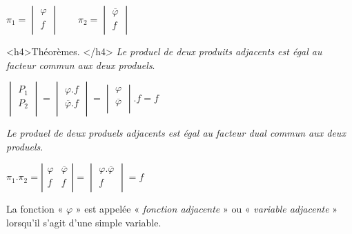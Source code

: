 \centerline{ ${\pi}_1  = \begin{vmatrix} \varphi \\  f \\ \end{vmatrix} \qquad 
                                        {\pi}_2 = \begin{vmatrix} \overline{\varphi}  \\  f \\ \end{vmatrix}  $ }
                    
<h4>Théorèmes. </h4> \emph{ Le produel de deux produits adjacents est égal au facteur commun aux deux produels}. 



\centerline{ $ \begin{vmatrix}
P_1\\P_2\\
\end{vmatrix} 
 = \begin{vmatrix}
        \varphi . f \\ \overline{\varphi} . f \\
    \end{vmatrix} 
       = \begin{vmatrix}
            \varphi \\ \overline{\varphi} \\ 
        \end{vmatrix} .f = f 
  $ }



 \emph{ Le produel de deux produels adjacents est égal au facteur dual commun  aux deux produels}. 
 

 
 \centerline{$
 {\pi}_1 . {\pi}_2 = \left| \begin{array}{c|c} 
                                    \varphi & \overline{\varphi}  \\
                                    f & f \\
                       \end{array}  \right|
       = \begin{vmatrix}
               \varphi . \overline{\varphi} \\ f   \\
       \end{vmatrix} = f 
 $}
 


La fonction « $\varphi$ » est appelée « \emph {fonction adjacente} » ou « \emph {variable adjacente}  » lorsqu'il s'agit d'une simple variable.   



